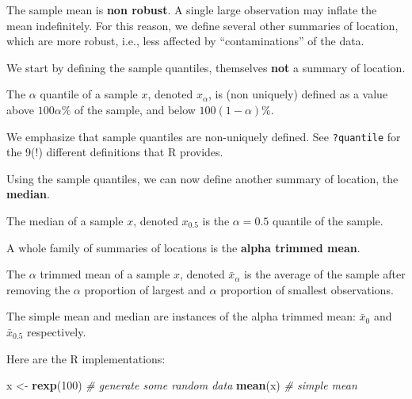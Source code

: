 \documentclass[]{book}
\newenvironment{Shaded}{\begin{snugshade}}{\end{snugshade}}
\newcommand{\KeywordTok}[1]{\textcolor[rgb]{0.13,0.29,0.53}{\textbf{#1}}}
\newcommand{\DecValTok}[1]{\textcolor[rgb]{0.00,0.00,0.81}{#1}}
\newcommand{\StringTok}[1]{\textcolor[rgb]{0.31,0.60,0.02}{#1}}
\newcommand{\CommentTok}[1]{\textcolor[rgb]{0.56,0.35,0.01}{\textit{#1}}}
\newcommand{\NormalTok}[1]{#1}
\theoremstyle{definition}
\theoremstyle{definition}
\theoremstyle{definition}
\theoremstyle{remark}
\let\BeginKnitrBlock\begin \let\EndKnitrBlock\end
\begin{document}
The sample mean is \textbf{non robust}. A single large observation may
inflate the mean indefinitely. For this reason, we define several other
summaries of location, which are more robust, i.e., less affected by
``contaminations'' of the data.

We start by defining the sample quantiles, themselves \textbf{not} a
summary of location.

\BeginKnitrBlock{definition}[Quantiles]
\protect\hypertarget{def:unnamed-chunk-71}{}{\label{def:unnamed-chunk-71}
{} }The \(\alpha\) quantile of a sample \(x\),
denoted \(x_\alpha\), is (non uniquely) defined as a value above
\(100 \alpha \%\) of the sample, and below \(100 (1-\alpha) \%\).
\EndKnitrBlock{definition}

We emphasize that sample quantiles are non-uniquely defined. See
\texttt{?quantile} for the 9(!) different definitions that R provides.

Using the sample quantiles, we can now define another summary of
location, the \textbf{median}.

\BeginKnitrBlock{definition}[Median]
\protect\hypertarget{def:unnamed-chunk-72}{}{\label{def:unnamed-chunk-72}
{} }The median of a sample \(x\), denoted
\(x_{0.5}\) is the \(\alpha=0.5\) quantile of the sample.
\EndKnitrBlock{definition}

A whole family of summaries of locations is the \textbf{alpha trimmed
mean}.

\BeginKnitrBlock{definition}[Alpha Trimmed Mean]
\protect\hypertarget{def:unnamed-chunk-73}{}{\label{def:unnamed-chunk-73}
{} }The \(\alpha\) trimmed mean of a
sample \(x\), denoted \(\bar x_\alpha\) is the average of the sample
after removing the \(\alpha\) proportion of largest and \(\alpha\)
proportion of smallest observations.
\EndKnitrBlock{definition}

The simple mean and median are instances of the alpha trimmed mean:
\(\bar x_0\) and \(\bar x_{0.5}\) respectively.

Here are the R implementations:

\begin{Shaded}
\begin{Highlighting}[]
\NormalTok{x <-}\StringTok{ }\KeywordTok{rexp}\NormalTok{(}\DecValTok{100}\NormalTok{) }\CommentTok{# generate some random data}
\KeywordTok{mean}\NormalTok{(x) }\CommentTok{# simple mean}
\end{Highlighting}
\end{Shaded}
\end{document}
